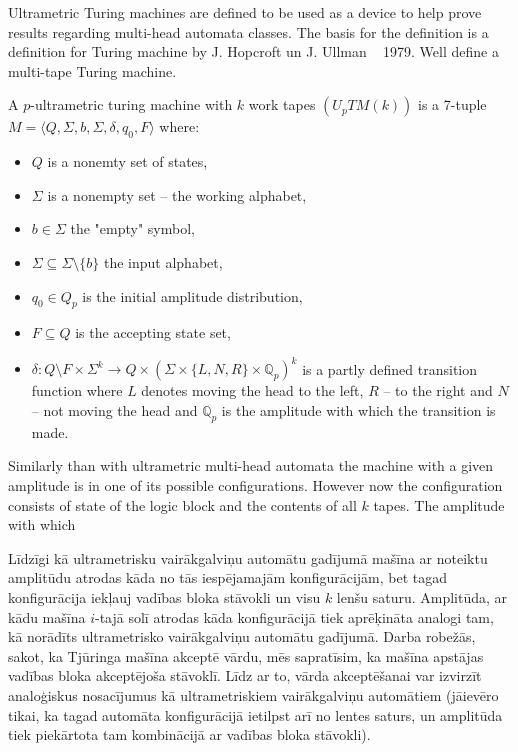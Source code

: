 \documentclass{llncs}
\begin{document}
\begin{definicija}
Ultrametric Turing machines are defined to be used as a device to help prove results regarding multi-head automata classes. The basis for the definition is a definition for Turing machine by J. Hopcroft un J. Ullman ~\citep{Hopcroft1979} 1979. Well define a multi-tape Turing machine.
\begin{definition}
A $p$-ultrametric turing machine with $k$ work tapes $(U_pTM(k))$ is a 7-tuple $M= \langle Q, \Sigma, b, \Sigma, \delta, q_0, F \rangle$ where:
\begin{itemize}
	\item $Q$ is a nonemty set of states,
	\item $\Sigma$ is a nonempty set -- the working alphabet,
	\item $b \in \Sigma$ the "empty" symbol,
	\item $\Sigma\subseteq\Sigma\setminus\{b\}$ the input alphabet,
	\item $q_0 \in Q_p$ is the initial amplitude distribution,
	\item $F \subseteq Q$ is the accepting state set,
	\item $\delta: Q \setminus F \times \Sigma^k \rightarrow Q \times \left(\Sigma \times \{L,N,R\} \times \mathbb{Q}_p \right)^k$ is a partly defined transition function where $L$ denotes moving the head to the left, $R$ -- to the right and $N$ -- not moving the head and $\mathbb{Q}_p$ is the amplitude with which the transition is made.
\end{itemize}
\end{definition}

Similarly than with ultrametric multi-head automata the machine with a given amplitude is in one of its possible configurations. However now the configuration consists of state of the logic block %
and the contents of all $k$ tapes. The amplitude with which 

Līdzīgi kā ultrametrisku vairākgalviņu automātu gadījumā mašīna ar noteiktu amplitūdu atrodas kāda no tās iespējamajām konfigurācijām, bet tagad konfigurācija iekļauj vadības bloka stāvokli un visu $k$ lenšu saturu. Amplitūda, ar kādu mašīna $i$-tajā solī atrodas kāda konfigurācijā tiek aprēķināta analogi tam, kā norādīts ultrametrisko vairākgalviņu automātu gadījumā. Darba robežās, sakot, ka Tjūringa mašīna akceptē vārdu, mēs sapratīsim, ka mašīna apstājas vadības bloka akceptējoša stāvoklī. Līdz ar to, vārda akceptēšanai var izvirzīt analoģiskus nosacījumus kā ultrametriskiem vairākgalviņu automātiem (jāievēro tikai, ka tagad automāta konfigurācijā ietilpst arī no lentes saturs, un amplitūda tiek piekārtota tam kombinācijā ar vadības bloka stāvokli).


\end{definicija}
\end{document}
